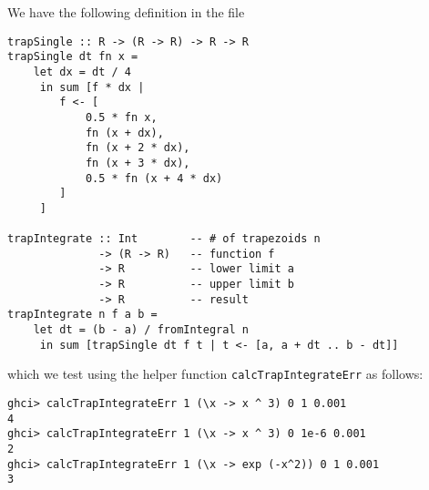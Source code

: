 
We have the following definition in the file 
\begin{verbatim}
trapSingle :: R -> (R -> R) -> R -> R
trapSingle dt fn x =
    let dx = dt / 4
     in sum [f * dx | 
        f <- [
            0.5 * fn x, 
            fn (x + dx), 
            fn (x + 2 * dx), 
            fn (x + 3 * dx), 
            0.5 * fn (x + 4 * dx)
        ]
     ]

trapIntegrate :: Int        -- # of trapezoids n
              -> (R -> R)   -- function f
              -> R          -- lower limit a
              -> R          -- upper limit b
              -> R          -- result
trapIntegrate n f a b =
    let dt = (b - a) / fromIntegral n
     in sum [trapSingle dt f t | t <- [a, a + dt .. b - dt]]
\end{verbatim}
which we test using the helper function \verb|calcTrapIntegrateErr| as follows:
\begin{verbatim}
ghci> calcTrapIntegrateErr 1 (\x -> x ^ 3) 0 1 0.001
4
ghci> calcTrapIntegrateErr 1 (\x -> x ^ 3) 0 1e-6 0.001
2
ghci> calcTrapIntegrateErr 1 (\x -> exp (-x^2)) 0 1 0.001
3
\end{verbatim}

